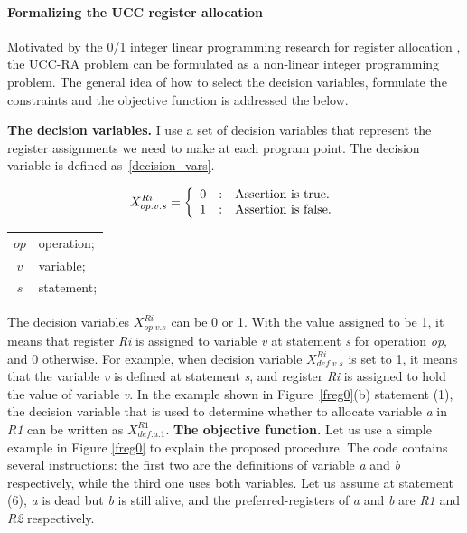\paragraph{Formalizing the UCC register allocation}
Motivated by the 0/1 integer linear programming research for register allocation \cite{related:ilp}, the UCC-RA problem can be formulated as a non-linear integer programming problem. The general idea of how to select the decision variables, formulate the constraints and the objective function is addressed the below. 

\textbf{The decision variables.} 
I use a set of decision variables that represent the register assignments we need to make at each program point. The decision variable is defined as~\ref{decision_vars}. 

\begin{small}
\begin{eqnarray}
X_{op.v.s}^{Ri} = \left\{\begin{array}{r@{\quad:\quad}l}
0  & \mbox{Assertion is true.}\\
1  & \mbox{Assertion is false.}
\label{decision_vars}
\end{array}\right.    
\end{eqnarray}

\begin{center}
\begin{tabular}{c|p{2.0in}} 
$op$ & operation;\\
$v$ &  variable;\\
$s$ & statement; \\
\end{tabular}
\end{center}
\end{small}

The decision variables $X_{op.v.s}^{Ri}$ can be 0 or 1.
With the value assigned to be 1, it means that register {\it Ri} is assigned to variable {\it v} at statement {\it s} for operation {\it op}, and 0 otherwise. For example, when decision variable $X_{def.v.s}^{Ri}$ is set to 1, it means that the variable {\it v} is defined at statement {\it s}, and  register {\it Ri} is assigned to hold the value of variable {\it v}. 
In the example shown in Figure~\ref{freg0}(b) statement (1), the decision variable that is used to determine whether
to allocate variable {\it a} in {\it R1} can be written as $X_{def.a.1}^{R1}$.
\textbf{The objective function.}
Let us use a simple example in Figure \ref{freg0} to explain the proposed procedure. The code contains several instructions: the first two are the definitions of variable {\it a} and {\it b} respectively, while the third one uses both variables. Let us assume at statement (6), {\it a} is dead but {\it b} is still alive, and the preferred-registers of {\it a} and {\it b} are {\it R1} and {\it R2} respectively.


